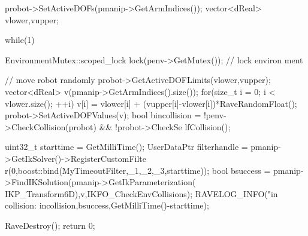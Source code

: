 \begin{DoxyCodeInclude}
{    probot->SetActiveDOFs(pmanip->GetArmIndices());
    vector<dReal> vlower,vupper;

    while(1) {
        {
            EnvironmentMutex::scoped_lock lock(penv->GetMutex()); // lock environ
      ment

            // move robot randomly
            probot->GetActiveDOFLimits(vlower,vupper);
            vector<dReal> v(pmanip->GetArmIndices().size());
            for(size_t i = 0; i < vlower.size(); ++i) {
                v[i] = vlower[i] + (vupper[i]-vlower[i])*RaveRandomFloat();
            }
            probot->SetActiveDOFValues(v);
            bool bincollision = !penv->CheckCollision(probot) && !probot->CheckSe
      lfCollision();

            uint32_t starttime = GetMilliTime();
            UserDataPtr filterhandle = pmanip->GetIkSolver()->RegisterCustomFilte
      r(0,boost::bind(MyTimeoutFilter,_1,_2,_3,starttime));
            bool bsuccess = pmanip->FindIKSolution(pmanip->GetIkParameterization(
      IKP_Transform6D),v,IKFO_CheckEnvCollisions);
            RAVELOG_INFO("in collision: %
      incollision,bsuccess,GetMilliTime()-starttime);
        }
    }

    RaveDestroy();
    return 0;
}
\end{DoxyCodeInclude}
 